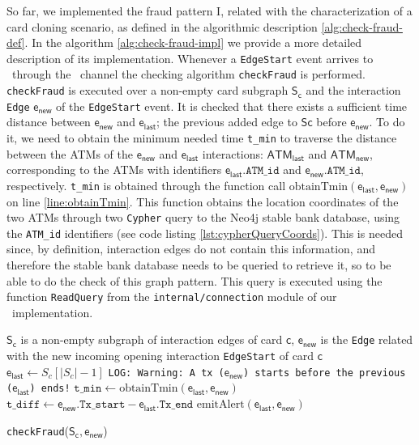 \begin{itemize}
    So far, we implemented the fraud pattern I, related with the characterization of a card cloning scenario, as defined in the algorithmic description \ref{alg:check-fraud-def}. 
    In the algorithm \ref{alg:check-fraud-impl} we provide a more detailed description of its implementation. Whenever a \texttt{EdgeStart} event arrives to \FW\ through the \internaledgech\ channel the checking algorithm \texttt{checkFraud} is performed. \texttt{checkFraud} is executed over a non-empty card subgraph $\mathsf{S_c}$ and the interaction \texttt{Edge} $\mathsf{e_{new}}$ of the \texttt{EdgeStart} event. It is checked that there exists a sufficient time distance between $\mathsf{e_{new}}$ and $\mathsf{e_{last}}$; the previous added edge to $\mathsf{Sc}$ before $\mathsf{e_{new}}$. To do it, we need to obtain the minimum needed time \texttt{t\_min} to traverse the distance between the ATMs of the $\mathsf{e_{new}}$ and $\mathsf{e_{last}}$ interactions: $\mathsf{ATM_{last}}$ and $\mathsf{ATM_{new}}$, corresponding to the ATMs with identifiers $\mathsf{e_{last}}.\texttt{ATM\_id}$ and $\mathsf{e_{new}}.\texttt{ATM\_id}$, respectively. \texttt{t\_min} is obtained through the function call $\text{obtainTmin}(\mathsf{e_{last}}, \mathsf{e_{new}})$ on line \ref{line:obtainTmin}. This function obtains the location coordinates of the two ATMs through two \texttt{Cypher} query to the Neo4j stable bank database, using the \texttt{ATM\_id} identifiers (see code listing \ref{lst:cypherQueryCoords}). This is needed since, by definition, interaction edges do not contain this information, and therefore the stable bank database needs to be queried to retrieve it, so to be able to do the check of this graph pattern. This query is executed using the function \texttt{ReadQuery} from the \texttt{internal/connection} module of our \DPATM\ implementation.

    \begin{algorithm}[H]
      \small
      \begin{algorithmic}[1]
      \REQUIRE $\mathsf{S_c}$ is a non-empty subgraph of interaction edges of card $\mathsf{c}$, $\mathsf{e_{new}}$ is the \texttt{Edge} related with the new incoming opening interaction \texttt{EdgeStart} of card $\mathsf{c}$
      \STATE $\mathsf{e_{last}} \gets S_c[|S_c| - 1]$ 
          \STATE \texttt{LOG: Warning: A tx ($\mathsf{e_{new}}$) starts before the previous ($\mathsf{e_{last}}$) ends!} 
          \RETURN
      \ENDIF
          \STATE $\texttt{t\_min} \gets \text{obtainTmin}(\mathsf{e_{last}}, \mathsf{e_{new}})$\label{line:obtainTmin}
          \STATE $\texttt{t\_diff} \gets \mathsf{e_{new}}.\texttt{Tx\_start} - \mathsf{e_{last}}.\texttt{Tx\_end}$
            \STATE $\text{emitAlert}(\mathsf{e_{last}}, \mathsf{e_{new}})$\label{line:emitAlert}
          \ENDIF
      \ENDIF
      \end{algorithmic}
      \caption{\texttt{checkFraud}($\mathsf{S_c, e_{new}}$)}
      \label{alg:check-fraud-impl}
    \end{algorithm}


\end{itemize}
